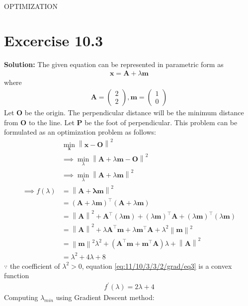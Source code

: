 \documentclass[12pt]{article}
\providecommand{\brak}[1]{\ensuremath{\left(#1\right)}}
\providecommand{\norm}[1]{\left\lVert#1\right\rVert}
\newcommand{\solution}{\noindent \textbf{Solution: }}
\newcommand{\myvec}[1]{\ensuremath{\begin{pmatrix}#1\end{pmatrix}}}
\let\vec\mathbf
\begin{document}
\begin{center}
\textbf\large{OPTIMIZATION}

\end{center}
\section*{Excercise 10.3}


\solution
\fi
The given equation can be represented in parametric form as
\begin{align}
	\label{eq:11/10/3/3/2/grad/eq2}
	\vec{x} = \vec{A}+\lambda\vec{m}
\end{align}
where
\begin{align}
	\vec{A} = \myvec{2\\2}, \vec{m} = \myvec{1\\0}
	\label{eq:11/10/3/3/2/grad/line}
\end{align}
Let $\vec{O}$ be the origin. The perpendicular distance will be the minimum distance from $\vec{O}$ to the line. Let $\vec{P}$ be the foot of perpendicular. This problem can be formulated as an optimization problem as follows:
\begin{align}
	& \min_{\vec{x}}\norm{\vec{x}-\vec{O}}^2\\
	& \implies \min_{\lambda}\norm{\vec{A}+\lambda\vec{m}-\vec{O}}^2\\
	& \implies \min_{\lambda}\norm{\vec{A}+\lambda\vec{m}}^2\\
	\implies f\brak{\lambda} &= \norm{\vec{A+\lambda\vec{m}}}^2\\
	&= \brak{\vec{A}+\lambda\vec{m}}^\top\brak{\vec{A}+\lambda\vec{m}}\\
	&= \norm{\vec{A}}^2+\vec{A}^\top\brak{\lambda\vec{m}}+\brak{\lambda\vec{m}}^\top\vec{A}+\brak{\lambda\vec{m}}^\top\brak{\lambda\vec{m}}\\
	&= \norm{\vec{A}}^2+\lambda\vec{A}^\top\vec{m}+\lambda\vec{m}^\top\vec{A}+\lambda^2\norm{\vec{m}}^2\\
	&= \norm{\vec{m}}^2\lambda^2+\brak{\vec{A}^\top\vec{m}+\vec{m}^\top\vec{A}}\lambda+\norm{\vec{A}}^2\\
	\label{eq:11/10/3/3/2/grad/eq3}
	&= \lambda^2+4\lambda+8
\end{align}
$\because$ the coefficient of $\lambda^2>0$, equation \eqref{eq:11/10/3/3/2/grad/eq3} is a convex function
\begin{align}
	\label{eq:11/10/3/3/2/grad/eq4}
	f^\prime\brak{\lambda} = 2\lambda+4
\end{align}
Computing $\lambda_{min}$ using Gradient Descent method:
\end{document}
